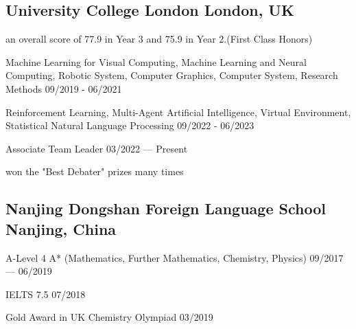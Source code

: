 
\subsection{
    University College London 
    \hfill London, UK
}
    \begin{zitemize}
        \item   an overall score of 77.9 in Year 3 and 75.9 in Year 2.(First Class Honors)
        \item   Machine Learning for Visual Computing, 
                Machine Learning and Neural Computing, 
                Robotic System, 
                Computer Graphics, 
                Computer System,
                Research Methods 
                \hfill 09/2019 - 06/2021
        \item   Reinforcement Learning,    
                Multi-Agent Artificial Intelligence,
                Virtual Environment,
                Statistical Natural Language Processing
                \hfill 09/2022 - 06/2023
    \end{zitemize}

    \begin{zitemize}
        \item   Associate Team Leader 
                \hfill 03/2022 --- Present
        \item   won the "Best Debater" prizes many times
    \end{zitemize}


\vspace{0.3em}


\subsection{
    Nanjing Dongshan Foreign Language School 
    \hfill Nanjing, China
}
    \begin{zitemize}
        \item   A-Level 4 A* (Mathematics, Further Mathematics, Chemistry, Physics) 
                \hfill 09/2017 --- 06/2019 
        \item   IELTS 7.5 
                \hfill 07/2018 
        \item   Gold Award in UK Chemistry Olympiad
                \hfill 03/2019
    \end{zitemize}


